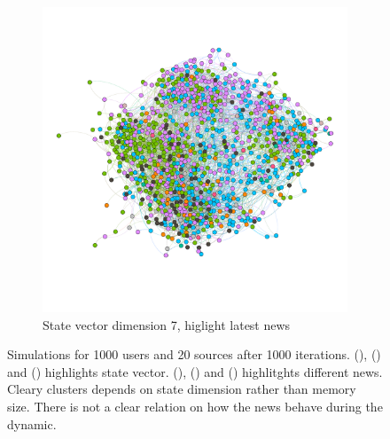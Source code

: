 \begin{figure}
\begin{subfigure}[t]{0.35\textwidth}
    \includegraphics[width=\textwidth]{img/dim7_news.pdf}
    \caption{State vector dimension 7, higlight
     latest news}
    \label{fig:bubble7news}
  \end{subfigure}
  \caption[Network results: bubble chamber]{Simulations for 1000 users and 20 sources after 1000
    iterations. (), () and
    () highlights state vector.
    (), () and
    () highlitghts different news.
    Cleary  clusters depends on state dimension rather than memory
    size. There is not a clear relation on how the news behave during
    the dynamic.
  }
  \label{fig:test}
\end{figure}
